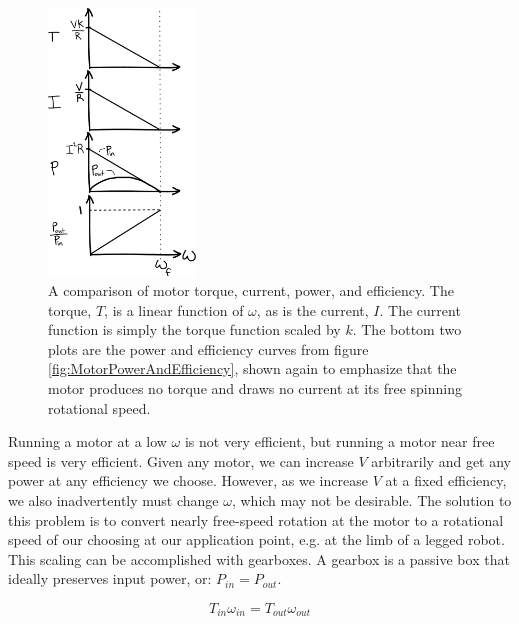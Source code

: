 \begin{figure}[h]		%
\begin{centering}
\includegraphics[width=0.35\textwidth]{Figures/FourMotorCurves}\par
\end{centering}
\caption[Plot: A Comparison of Four Motor Curves vs. $\omega$]{A comparison of motor torque, current, power, and efficiency. The torque, $T$, is a linear function of $\omega$, as is the current, $I$. The current function is simply the torque function scaled by $k$. The bottom two plots are the power and efficiency curves from figure \ref{fig:MotorPowerAndEfficiency}, shown again to emphasize that the motor produces no torque and draws no current at its free spinning rotational speed.}
\label{fig:FourMotorCurves}
\end{figure}
%

Running a motor at a low $\omega$ is not very efficient, but running a motor near free speed is very efficient. Given any motor, we can increase $V$ arbitrarily and get any power at any efficiency we choose. However, as we increase $V$ at a fixed efficiency, we also inadvertently must change $\omega$, which may not be desirable. The solution to this problem is to convert nearly free-speed rotation at the motor to a rotational speed of our choosing at our application point, e.g. at the limb of a legged robot. This scaling can be accomplished with gearboxes. A gearbox is a passive box that ideally preserves input power, or: $P_{in}=P_{out}$.

\begin{equation}
T_{in}\omega_{in} = T_{out}\omega_{out}
\label{eq:GearboxExample}
\end{equation}

